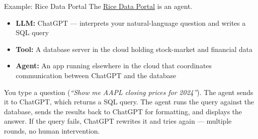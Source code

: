 \documentclass[aspectratio=169]{beamer}
\begin{document}
\begin{frame}{Example: Rice Data Portal}
The \href{https://data-portal.rice-business.org}{Rice Data Portal} is an agent.
\vspace{0.3cm}
\begin{itemize}
  \item \textbf{LLM:} ChatGPT --- interprets your natural-language question and writes a SQL query
  \item \textbf{Tool:} A database server in the cloud holding stock-market and financial data
  \item \textbf{Agent:} An app running elsewhere in the cloud that coordinates communication between ChatGPT and the database
\end{itemize}
\vspace{0.3cm}
You type a question (\textit{``Show me AAPL closing prices for 2024''}).  The agent sends it to ChatGPT, which returns a SQL query.  The agent runs the query against the database, sends the results back to ChatGPT for formatting, and displays the answer.  If the query fails, ChatGPT rewrites it and tries again --- multiple rounds, no human intervention.
\end{frame}
\end{document}
